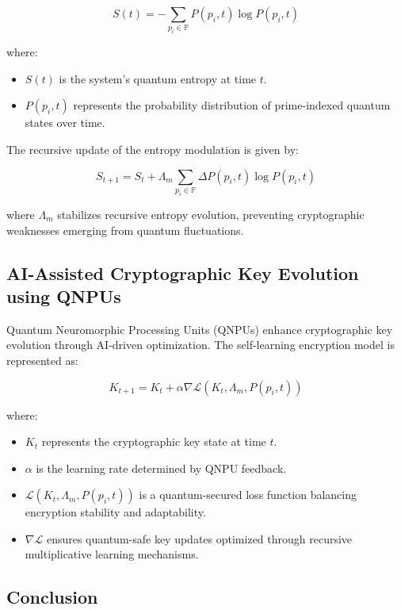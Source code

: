 \documentclass{article}
\theoremstyle{plain}
\begin{document}
\begin{equation}
    S(t) = - \sum_{p_i \in \mathbb{P}} P(p_i, t) \log P(p_i, t)
\end{equation}

where:
\begin{itemize}
    \item $S(t)$ is the system’s quantum entropy at time $t$.
    \item $P(p_i, t)$ represents the probability distribution of prime-indexed quantum states over time.
\end{itemize}

The recursive update of the entropy modulation is given by:

\begin{equation}
    S_{t+1} = S_t + \Lambda_m \sum_{p_i \in \mathbb{P}} \Delta P(p_i, t) \log P(p_i, t)
\end{equation}

where $\Lambda_m$ stabilizes recursive entropy evolution, preventing cryptographic weaknesses emerging from quantum fluctuations.

\subsection{AI-Assisted Cryptographic Key Evolution using QNPUs}

Quantum Neuromorphic Processing Units (QNPUs) enhance cryptographic key evolution through AI-driven optimization. The self-learning encryption model is represented as:

\begin{equation}
    K_{t+1} = K_t + \alpha \nabla \mathcal{L}(K_t, \Lambda_m, P(p_i, t))
\end{equation}

where:
\begin{itemize}
    \item $K_t$ represents the cryptographic key state at time $t$.
    \item $\alpha$ is the learning rate determined by QNPU feedback.
    \item $\mathcal{L}(K_t, \Lambda_m, P(p_i, t))$ is a quantum-secured loss function balancing encryption stability and adaptability.
    \item $\nabla \mathcal{L}$ ensures quantum-safe key updates optimized through recursive multiplicative learning mechanisms.
\end{itemize}

\subsection{Conclusion}
\end{document}
